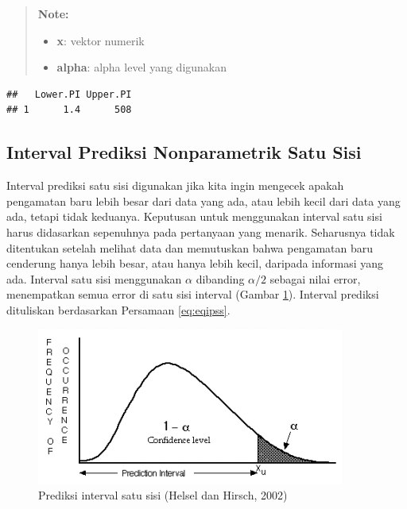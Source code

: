 \documentclass[]{book}
\newenvironment{Shaded}{\begin{snugshade}}{\end{snugshade}}
\newcommand{\KeywordTok}[1]{\textcolor[rgb]{0.13,0.29,0.53}{\textbf{#1}}}
\newcommand{\DataTypeTok}[1]{\textcolor[rgb]{0.13,0.29,0.53}{#1}}
\newcommand{\FloatTok}[1]{\textcolor[rgb]{0.00,0.00,0.81}{#1}}
\newcommand{\OperatorTok}[1]{\textcolor[rgb]{0.81,0.36,0.00}{\textbf{#1}}}
\newcommand{\NormalTok}[1]{#1}
\providecommand{\tightlist}{%
  \setlength{\itemsep}{0pt}\setlength{\parskip}{0pt}}
\begin{document}
\begin{quote}
\textbf{Note: }

\begin{itemize}
\tightlist
\item
  \textbf{x}: vektor numerik
\item
  \textbf{alpha}: alpha level yang digunakan
\end{itemize}
\end{quote}

\begin{Shaded}
\end{Shaded}

\begin{verbatim}
##   Lower.PI Upper.PI
## 1      1.4      508
\end{verbatim}

\subsection{Interval Prediksi Nonparametrik Satu
Sisi}\label{interval-prediksi-nonparametrik-satu-sisi}

Interval prediksi satu sisi digunakan jika kita ingin mengecek apakah
pengamatan baru lebih besar dari data yang ada, atau lebih kecil dari
data yang ada, tetapi tidak keduanya. Keputusan untuk menggunakan
interval satu sisi harus didasarkan sepenuhnya pada pertanyaan yang
menarik. Seharusnya tidak ditentukan setelah melihat data dan memutuskan
bahwa pengamatan baru cenderung hanya lebih besar, atau hanya lebih
kecil, daripada informasi yang ada. Interval satu sisi menggunakan
\(\alpha\) dibanding \(\alpha/2\) sebagai nilai error, menempatkan semua
error di satu sisi interval (Gambar \ref{fig:ipss}). Interval prediksi
dituliskan berdasarkan Persamaan \eqref{eq:eqipss}.

\begin{figure}

{\centering \includegraphics[width=0.65\linewidth]{ipss} 

}

\caption{Prediksi interval satu sisi (Helsel dan Hirsch, 2002)}\label{fig:ipss}
\end{figure}
\end{document}
